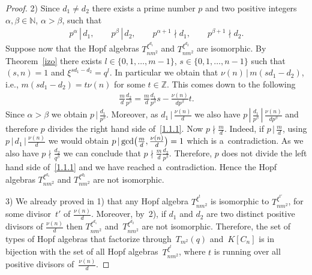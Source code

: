 \documentclass[pdftex]{sigma}
\numberwithin{equation}{section}
\begin{document}
\begin{proof}
2) Since $d_{1} \neq d_{2}$ there exists a prime number $p$ and two positive integers $\alpha, \beta \in \mathbb{N}$, $\alpha > \beta$, such that
\begin{gather*}
p^{\alpha} \,|\, d_{1}, \qquad p^{\beta} \,|\, d_{2}, \qquad p^{\alpha+1} \nmid d_{1}, \qquad p^{\beta+1} \nmid d_{2}.
\end{gather*}
Suppose now that the Hopf algebras $T_{nm^{2}}^ {\xi^{d_{1}}}$ and $T_{nm^{2}}^ {\xi^{d_{2}}}$ are isomorphic. By Theorem~\ref{izo} there
exists $l \in \{ 0, 1,\dots, m-1 \}$, $s \in \{ 0, 1, \dots, n-1 \}$ such that $(s, n) = 1$ and $\xi^{sd_{1} - d_{2}} = q^{l}$. In particular we obtain that $\nu(n) \,|\, m(sd_{1} - d_{2})$, i.e., $m(sd_{1} - d_{2}) = t \nu(n)$ for some $t \in \mathbb{Z}$. This comes down to the following
\begin{gather}\label{1.1.1}
 \frac{m}{d} \frac{d_{2}}{p^{\beta}} = \frac{m}{d} \frac{d_{1}}{p^{\beta}} s - \frac{\nu(n)}{dp^{\beta}} t.
\end{gather}
Since $\alpha > \beta$ we obtain $p \,|\, \frac{d_{1}}{p^{\beta}}$. Moreover, as $ d_{1} \,|\, \frac{\nu(n)}{d}$ we also have $p \,|\,\frac{d_{1}}{p^{\beta}} \,|\, \frac{\nu(n)}{dp^{\beta}}$ and therefore $p$ divides the right hand side of~\eqref{1.1.1}. Now $p \nmid
 \frac{m}{d}$. Indeed, if $p \,|\, \frac{m}{d}$, using $p \,|\, d_{1} \,|\, \frac{\nu(n)}{d}$ we would obtain $p \,|\, {\rm gcd}\big( \frac{m}{d}, \frac{\nu(n)}{d}\big) = 1$ which is a~contradiction. As we also have $p \nmid \frac{d_{2}}{q^{\beta}}$ we can conclude that $p
\nmid \frac{m}{d} \frac{d_{2}}{p^{\beta}}$. Therefore, $p$ does not divide the left hand side of~\eqref{1.1.1} and we have reached a~contradiction. Hence the Hopf algebras $T_{nm^{2}}^ {\xi^{d_{1}}}$ and $T_{nm^{2}}^ {\xi^{d_{2}}}$ are not isomorphic.

3) We already proved in 1) that any Hopf algebra $T_{nm^{2}}^{\xi^{t}}$ is isomorphic to $T_{nm^{2}}^ {\xi^{t'}}$, for some divisor~$t'$ of $ \frac{\nu(n)}{d}$. Moreover, by~2), if $d_1$ and $d_2$ are two distinct positive divisors of $ \frac{\nu(n)}{d}$ then $T_{nm^{2}}^ {\xi^{d_{1}}}$
and~$T_{nm^{2}}^ {\xi^{d_{2}}}$ are not isomorphic. Therefore, the set of types of Hopf algebras that factorize through~$T_{m^{2}}(q)$ and~$K[C_n]$ is in bijection with the set of all Hopf algebras~$T_{nm^{2}}^ {\xi^{t}}$, where $t$ is running over all positive divisors of~$ \frac{\nu(n)}{d}$.
\end{proof}
\end{document}
